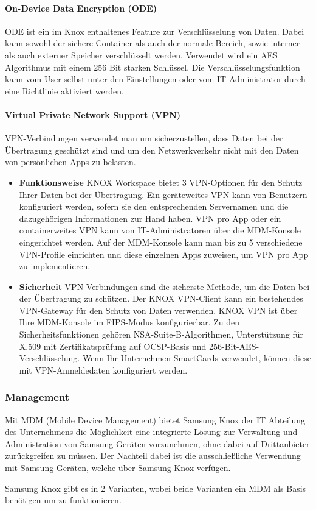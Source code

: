\paragraph{On-Device Data Encryption (ODE)}
ODE ist ein im Knox enthaltenes Feature zur Verschlüsselung von Daten. Dabei kann sowohl der sichere Container als auch der normale Bereich, sowie interner als auch externer Speicher verschlüsselt werden. Verwendet wird ein AES Algorithmus mit einem 256 Bit starken Schlüssel. Die Verschlüsselungsfunktion kann vom User selbst unter den Einstellungen oder vom IT Administrator durch eine Richtlinie aktiviert werden.
\paragraph{Virtual Private Network Support (VPN)}
VPN-Verbindungen verwendet man um sicherzustellen, dass Daten bei der Übertragung geschützt sind und um den Netzwerkverkehr nicht mit den Daten von persönlichen Apps zu belasten.
\begin{itemize}
	\item \textbf{Funktionsweise} \newline 
	KNOX Workspace bietet 3 VPN-Optionen für den Schutz Ihrer Daten bei der Übertragung. Ein geräteweites VPN kann von Benutzern konfiguriert werden, sofern sie den entsprechenden Servernamen und die dazugehörigen Informationen zur Hand haben. VPN pro App oder ein containerweites VPN kann von IT-Administratoren über die MDM-Konsole eingerichtet werden. Auf der MDM-Konsole kann man bis zu 5 verschiedene VPN-Profile einrichten und diese einzelnen Apps zuweisen, um VPN pro App zu implementieren.
	\item \textbf{Sicherheit} \newline 
	VPN-Verbindungen sind die sicherste Methode, um die Daten bei der Übertragung zu schützen. Der KNOX VPN-Client kann ein bestehendes VPN-Gateway für den Schutz von Daten verwenden. KNOX VPN ist über Ihre MDM-Konsole im FIPS-Modus konfigurierbar. Zu den Sicherheitsfunktionen gehören NSA-Suite-B-Algorithmen, Unterstützung für X.509 mit Zertifikatsprüfung auf OCSP-Basis und 256-Bit-AES-Verschlüsselung. Wenn Ihr Unternehmen SmartCards verwendet, können diese mit VPN-Anmeldedaten konfiguriert werden.
\end{itemize}

\subsubsection{Management}
Mit MDM (Mobile Device Management) bietet Samsung Knox der IT Abteilung des Unternehmens die Möglichkeit eine integrierte Lösung zur Verwaltung und Administration von Samsung-Geräten vorzunehmen, ohne dabei auf Drittanbieter zurückgreifen zu müssen. Der Nachteil dabei ist die ausschließliche Verwendung mit Samsung-Geräten, welche über Samsung Knox verfügen.
\par
Samsung Knox gibt es in 2 Varianten, wobei beide Varianten ein MDM als Basis benötigen um zu funktionieren.
